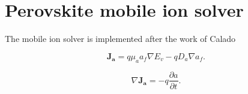\section{Perovskite mobile ion solver}
The mobile ion solver is implemented after the work of Calado \cite{calado2016evidence}

\begin{equation}
\label{eq:pdrive}
\boldsymbol{J_a} = q \mu_a a_{f}  {\nabla E_{v}}  - q D_a {\nabla a_{f}}.
\end{equation}

\begin{equation}
\label{eq:contp}
\nabla \boldsymbol{J_a} = - q \frac{\partial a}{\partial t}.
\end{equation}


